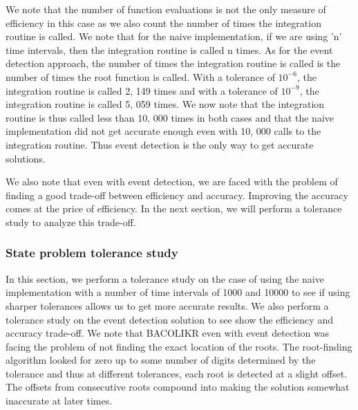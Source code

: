 \documentclass{article}
\begin{document}
We note that the number of function evaluations is not the only measure of efficiency in this case as we also count the number of times the integration routine is called. We note that for the naive implementation, if we are using 'n' time intervals, then the integration routine is called n times. As for the event detection approach, the number of times the integration routine is called is the number of times the root function is called. With a tolerance of $10^{-6}$, the integration routine is called 2, 149 times and with a tolerance of $10^{-9}$, the integration routine is called 5, 059 times. We now note that the integration routine is thus called less than 10, 000 times in both cases and that the naive implementation did not get accurate enough even with 10, 000 calls to the integration routine. Thus event detection is the only way to get accurate solutions.

We also note that even with event detection, we are faced with the problem of finding a good trade-off between efficiency and accuracy. Improving the accuracy comes at the price of efficiency. In the next section, we will perform a tolerance study to analyze this trade-off.

\subsubsection{State problem tolerance study}
\label{subsubsection:pde_state_tol_study}
In this section, we perform a tolerance study on the case of using the naive implementation with a number of time intervals of 1000 and 10000 to see if using sharper tolerances allows us to get more accurate results. We also perform a tolerance study on the event detection solution to see show the efficiency and accuracy trade-off. We note that BACOLIKR even with event detection was facing the problem of not finding the exact location of the roots. The root-finding algorithm looked for zero up to some number of digits determined by the tolerance and thus at different tolerances, each root is detected at a slight offset. The offsets from consecutive roots compound into making the solution somewhat inaccurate at later times. 
\end{document}
